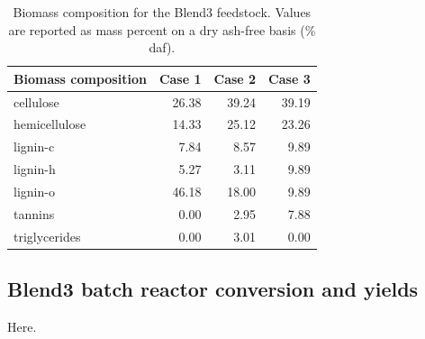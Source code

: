 \begin{table}[H]
    \centering
    \caption{Biomass composition for the Blend3 feedstock. Values are reported as mass percent on a dry ash-free basis (\% daf).}
    \label{tab:blend3-biocomp}
    \begin{tabular}{lrrr}
        \toprule
        Biomass composition & Case 1 & Case 2 & Case 3 \\
        \midrule
        cellulose     & 26.38 & 39.24 & 39.19 \\
        hemicellulose & 14.33 & 25.12 & 23.26 \\
        lignin-c      & 7.84  & 8.57  & 9.89 \\
        lignin-h      & 5.27  & 3.11  & 9.89 \\
        lignin-o      & 46.18 & 18.00 & 9.89 \\
        tannins       & 0.00  & 2.95  & 7.88 \\
        triglycerides & 0.00  & 3.01  & 0.00 \\
        \bottomrule
    \end{tabular}
\end{table}

\subsection{Blend3 batch reactor conversion and yields}

Here.
